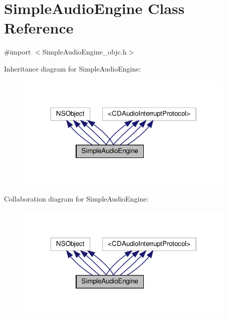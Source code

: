 \hypertarget{interfaceSimpleAudioEngine}{}\section{Simple\+Audio\+Engine Class Reference}
\label{interfaceSimpleAudioEngine}


{\ttfamily \#import $<$Simple\+Audio\+Engine\+\_\+objc.\+h$>$}



Inheritance diagram for Simple\+Audio\+Engine\+:
\nopagebreak
\begin{figure}[H]
\begin{center}
\leavevmode
\includegraphics[width=298pt]{interfaceSimpleAudioEngine__inherit__graph}
\end{center}
\end{figure}


Collaboration diagram for Simple\+Audio\+Engine\+:
\nopagebreak
\begin{figure}[H]
\begin{center}
\leavevmode
\includegraphics[width=298pt]{interfaceSimpleAudioEngine__coll__graph}
\end{center}
\end{figure}
